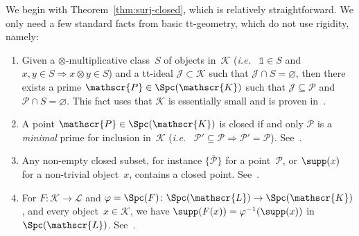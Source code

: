 \documentclass{amsart}
\numberwithin{equation}{section}
\theoremstyle{remark}
\begin{document}
We begin with Theorem~\ref{thm:surj-closed}, which is relatively straightforward. We only need a few standard facts from basic tt-geometry, which do not use rigidity, namely:
\begin{enumerate}[\rm(A)]
\item
\label{it:A}Given a $\otimes$-multiplicative class~$S$ of objects in~${\mathscr{{K}}}$ ({{\sl i.e.}\ } ${\mathbb{1}}\in S$ and $x,y\in S {\Rightarrow} x\otimes y\in S$) and a tt-ideal ${\mathscr{{J}}}\subset{\mathscr{{K}}}$ such that ${\mathscr{{J}}}\cap S=\varnothing$, then there exists a prime ${{\mathscr{{P}}}}\in{\Spc({\mathscr{K}})}$ such that ${\mathscr{{J}}}\subseteq{{\mathscr{{P}}}}$ and ${{\mathscr{{P}}}}\cap S=\varnothing$. This fact uses that ${\mathscr{{K}}}$ is essentially small and is proven in~\cite[Lemma~2.2]{Balmer05a}.
\smallbreak
\item
\label{it:B}A point ${{\mathscr{{P}}}}\in{\Spc({\mathscr{K}})}$ is closed if and only ${{\mathscr{{P}}}}$ is a \emph{minimal} prime for inclusion in~${\mathscr{{K}}}$ ({{\sl i.e.}\ } ${{\mathscr{{P}}}}'\subseteq{{\mathscr{{P}}}}{\Rightarrow} {{\mathscr{{P}}}}'={{\mathscr{{P}}}}$). See~\cite[Prop.\,2.9]{Balmer05a}.
\smallbreak
\item
\label{it:C}Any non-empty closed subset, for instance ${\overline{\{{{\mathscr{{P}}}}\}}}$ for a point~${{\mathscr{{P}}}}$, or $\supp(x)$ for a non-trivial object~$x$, contains a closed point. See~\cite[Cor.\,2.12]{Balmer05a}.
\smallbreak
\item
\label{it:D}For $F\colon{\mathscr{{K}}}\to {\mathscr{{L}}}$ and $\varphi=\Spc(F)\colon{\Spc({\mathscr{L}})}\to {\Spc({\mathscr{K}})}$, and every object~$x\in{\mathscr{{K}}}$, we have $\supp(F(x))=\varphi{^{-1}}(\supp(x))$ in~${\Spc({\mathscr{L}})}$. See~\cite[Prop.\,3.6]{Balmer05a}.
\end{enumerate}
\end{document}
